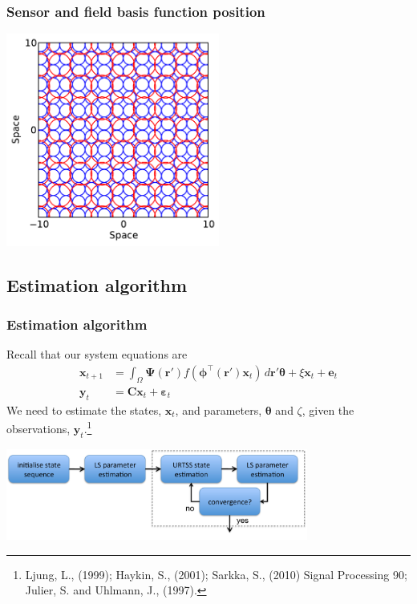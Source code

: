 \documentclass[compress]{beamer}
\begin{document}
\begin{frame}\frametitle{Sensor and field basis function position}
	\begin{center}
		\includegraphics[height=7cm]{./Figures/FieldAndSensors.pdf}
	\end{center}
\end{frame}

\subsection[Estimation algorithm]{Estimation algorithm}


\begin{frame}\frametitle{Estimation algorithm}
	Recall that our system equations are
	\begin{align}
		\mathbf{x}_{t+1} &= \int_\Omega \boldsymbol{\Psi}(\mathbf{r}') f(\boldsymbol{\phi}^{\top}(\mathbf{r}')\mathbf{x}_t) \, d\mathbf{r}' \boldsymbol{\theta} + \xi\mathbf{x}_t 
	+ \mathbf{e}_t \nonumber \\
	\mathbf{y}_t &= \mathbf{C}\mathbf{x}_t + \boldsymbol{\varepsilon}_t \nonumber
	\end{align}
	\pause
We need to estimate the states, $\mathbf{x}_t$, and parameters, $\boldsymbol\theta$ and $\zeta$, given the observations, $\mathbf{y}_t$.\footnote{Ljung, L., (1999); Haykin, S., (2001); Sarkka, S., (2010) Signal Processing 90; Julier, S. and Uhlmann, J., (1997).}
	\pause	
	\begin{center}
	\includegraphics[height=3cm]{./Figures/EstimationAlgorithm.pdf}
\end{center}


\end{frame}
\end{document}
